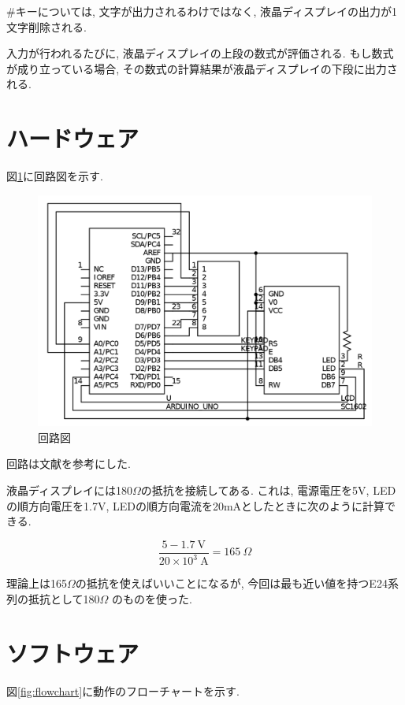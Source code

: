 \documentclass[titlepage]{jsarticle}
\begin{document}
    \#キーについては, 文字が出力されるわけではなく, 液晶ディスプレイの出力が1文字削除される.

    入力が行われるたびに, 液晶ディスプレイの上段の数式が評価される.
    もし数式が成り立っている場合, その数式の計算結果が液晶ディスプレイの下段に出力される.

\section{ハードウェア}
    図\ref{fig:circuit2}に回路図を示す.

    \begin{figure}[h]
        \centering
        \includegraphics[width=12cm]{img/circuit2.png}
        \caption{回路図}
        \label{fig:circuit2}
    \end{figure}

    回路は文献\cite{circuit}を参考にした.

    液晶ディスプレイには180$\Omega$の抵抗を接続してある.
    これは, 電源電圧を5V, LEDの順方向電圧を1.7V, LEDの順方向電流を20mAとしたときに次のように計算できる.

    \begin{equation}
        \frac{5 - 1.7 \ \mathrm{V}}{20 \times 10^3 \ \mathrm{A}} = 165 \ \Omega
    \end{equation}

    理論上は165$\Omega$の抵抗を使えばいいことになるが, 今回は最も近い値を持つE24系列の抵抗として180$\Omega$
    のものを使った.

\section{ソフトウェア}
    図\ref{fig:flowchart}に動作のフローチャートを示す.
\end{document}
